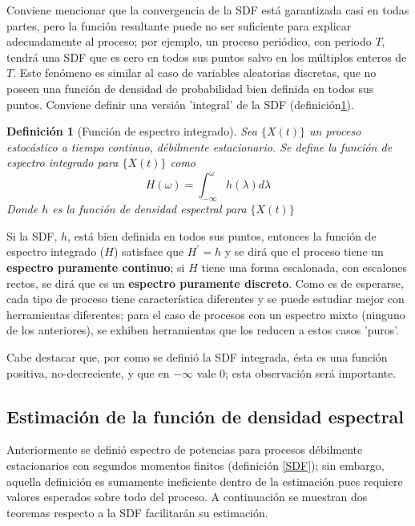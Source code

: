 \documentclass[12pt,a4paper]{mitthesis}
\newtheorem{defn}{Definici\'on}
\newcommand{\prima}{^{\prime}}
\begin{document}
Conviene mencionar que la convergencia de la SDF est\'a garantizada casi en todas partes, pero la
funci\'on resultante puede no ser suficiente para explicar adecuadamente al proceso; por ejemplo, 
un proceso peri\'odico, con periodo $T$, tendr\'a una SDF que es cero en todos sus puntos salvo en 
los m\'ultiplos enteros de $T$.
Este fen\'omeno es similar al caso de variables aleatorias discretas, que no poseen una funci\'on 
de densidad de probabilidad bien definida en todos sus puntos.
Conviene definir una versi\'on 'integral' de la SDF (definici\'on\ref{SDF_integrado}).

\begin{defn}[Funci\'on de espectro integrado]
Sea $\{X(t)\}$ un proceso estoc\'astico a tiempo continuo, d\'ebilmente estacionario. Se define la 
funci\'on de espectro integrado para $\{X(t)\}$ como
\begin{equation*}
H(\omega) = \int_{-\infty}^{\omega} h(\lambda) d\lambda
\end{equation*}
Donde $h$ es la funci\'on de densidad espectral para $\{X(t)\}$
\label{SDF_integrado}
\end{defn}

Si la SDF, $h$, est\'a bien definida en todos sus puntos, entonces la funci\'on de espectro 
integrado ($H$) satisface que $H\prima= h$ y se dir\'a que el proceso tiene un \textbf{espectro 
puramente continuo}; si $H$ tiene una forma escalonada, con escalones rectos, se dir\'a que es un 
\textbf{espectro puramente discreto}.
Como es de esperarse, cada tipo de proceso tiene caracter\'istica diferentes y se puede estudiar 
mejor con herramientas diferentes; para el caso de procesos con un espectro mixto (ninguno de los 
anteriores), se exhiben herramientas que los reducen a estos casos 'puros'.

Cabe destacar que, por como se defini\'o la SDF integrada, \'esta es una funci\'on positiva, 
no-decreciente, y que en $-\infty$ vale 0; esta observaci\'on ser\'a importante.


\subsection{Estimaci\'on de la funci\'on de densidad espectral}

Anteriormente se defini\'o espectro de potencias para procesos d\'ebilmente estacionarios con 
segundos momentos finitos (definici\'on \ref{SDF}); sin embargo, aquella definici\'on es sumamente 
ineficiente dentro de la estimaci\'on pues requiere valores esperados sobre todo del proceso.
A continuaci\'on se muestran dos teoremas respecto a la SDF facilitar\'an su estimaci\'on.
\end{document}
